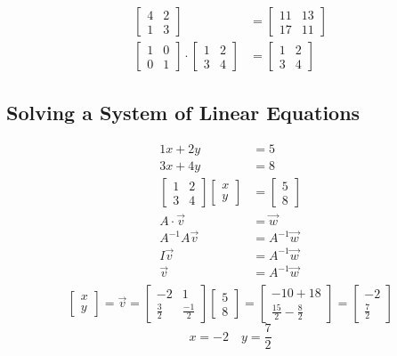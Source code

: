 \documentclass[letterpaper, 12pt]{math}
\begin{document}
\begin{align*}
\begin{bmatrix}
    4 & 2 \\
    1 & 3
  \end{bmatrix}&=
  \begin{bmatrix}
    11 & 13 \\
    17 & 11
  \end{bmatrix}\\
  \begin{bmatrix}
    1 & 0 \\
    0 & 1
  \end{bmatrix}\cdot
  \begin{bmatrix}
    1 & 2 \\
    3 & 4
  \end{bmatrix}&=
  \begin{bmatrix}
    1 & 2 \\
    3 & 4
  \end{bmatrix}
\end{align*}

\subsection*{Solving a System of Linear Equations}
\begin{align*}
  1x+2y &= 5 \\
  3x+4y &= 8 \\
  \begin{bmatrix} 1 & 2 \\ 3 & 4 \end{bmatrix}
  \begin{bmatrix} x \\ y \end{bmatrix} &=
    \begin{bmatrix} 5 \\ 8 \end{bmatrix} \\
  A\cdot\vec{v} &= \vec{w} \\
  A^{-1}A\vec{v} &= A^{-1}\vec{w} \\
  I\vec{v} &= A^{-1}\vec{w} \\
  \vec{v} &= A^{-1}\vec{w} \\
\end{align*}
\[ \begin{bmatrix} x \\ y \end{bmatrix} = \vec{v} =
   \begin{bmatrix} -2 & 1 \\ \frac{3}{2} & \frac{-1}{2} \end{bmatrix}
   \begin{bmatrix} 5 \\ 8 \end{bmatrix} =
   \begin{bmatrix} -10+18 \\ \frac{15}{2}-\frac{8}{2} \end{bmatrix} =
   \begin{bmatrix} -2 \\ \frac{7}{2} \end{bmatrix}
\]
\[ x = -2 \quad y = \frac{7}{2} \]
\end{document}
